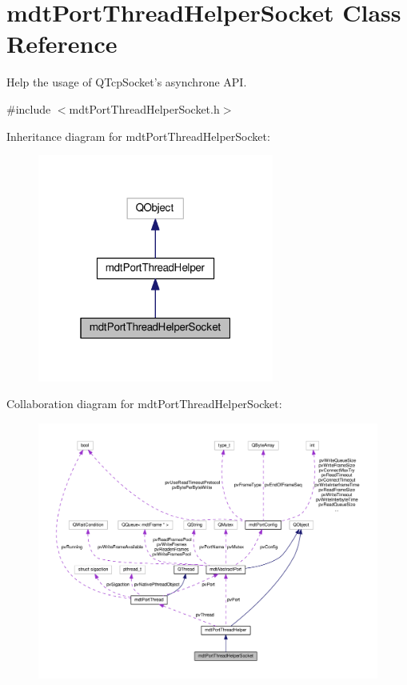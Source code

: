 \hypertarget{classmdt_port_thread_helper_socket}{\section{mdt\-Port\-Thread\-Helper\-Socket Class Reference}
\label{classmdt_port_thread_helper_socket}
}


Help the usage of Q\-Tcp\-Socket's asynchrone A\-P\-I.  




{\ttfamily \#include $<$mdt\-Port\-Thread\-Helper\-Socket.\-h$>$}



Inheritance diagram for mdt\-Port\-Thread\-Helper\-Socket\-:
\nopagebreak
\begin{figure}[H]
\begin{center}
\leavevmode
\includegraphics[width=220pt]{classmdt_port_thread_helper_socket__inherit__graph}
\end{center}
\end{figure}


Collaboration diagram for mdt\-Port\-Thread\-Helper\-Socket\-:
\nopagebreak
\begin{figure}[H]
\begin{center}
\leavevmode
\includegraphics[width=350pt]{classmdt_port_thread_helper_socket__coll__graph}
\end{center}
\end{figure}
